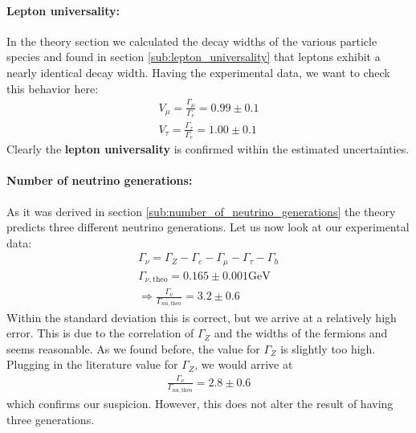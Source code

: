 \paragraph{\textbf{Lepton universality:}} 
\label{par:lepton_universality} In the theory section we calculated the decay widths of the various
particle species and found in section \ref{sub:lepton_universality} that leptons exhibit a nearly identical
decay width. Having the experimental data, we want to check this behavior here: 
\label{ssub:leptonun}
\begin{align}
    V_\mu = \frac{\Gamma_\mu}{\Gamma_e} = 0.99 \pm 0.1 \\ 
    V_\tau = \frac{\Gamma_\tau}{\Gamma_e} = 1.00 \pm 0.1 
\end{align}
Clearly the \textbf{lepton universality} is confirmed within the estimated uncertainties.

\paragraph{\textbf{Number of neutrino generations:}}
\label{par:number_of_neutrino_generations}
As it was derived in section \ref{sub:number_of_neutrino_generations} the theory predicts three different neutrino generations.
Let us now look at our experimental data:
\begin{align}
    \label{eq:gen}
    \Gamma_\nu = \Gamma_Z - \Gamma_e - \Gamma_\mu - \Gamma_\tau - \Gamma_h \\ 
    \Gamma_{\nu, \mathrm{theo}} = 0.165 \pm 0.001 \mathrm{GeV} \\ 
    \Rightarrow \frac{\Gamma_\nu}{\Gamma_{nu, \mathrm{theo}}}  = 3.2 \pm 0.6
\end{align}
Within the standard deviation this is correct, but we arrive at a relatively high error. This is due to the
correlation of $\Gamma_Z$ and the widths of the fermions and seems reasonable. As we found before, the value for
$\Gamma_Z$ is slightly too high. Plugging in the literature value for $\Gamma_Z$, we would arrive at
\begin{align}
   \frac{\Gamma_\nu}{\Gamma_{nu, \mathrm{theo}}}  = 2.8 \pm 0.6
\end{align}
which confirms our suspicion. However, this does not alter the result of having three generations.

